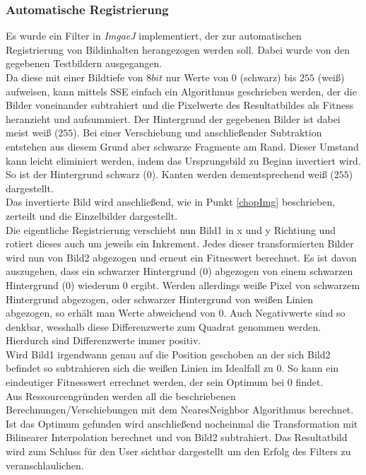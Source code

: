 \documentclass[12pt,german]{article}
\begin{document}
\subsubsection{Automatische Registrierung}
Es wurde ein Filter in \textit{ImgaeJ} implementiert, der zur automatischen Registrierung von Bildinhalten herangezogen werden soll. Dabei wurde von den gegebenen Testbildern ausgegangen. \\
Da diese mit einer Bildtiefe von $8 bit$ nur Werte von $0$ (schwarz) bis $255$ (weiß) aufweisen, kann mittels SSE einfach ein Algorithmus geschrieben werden, der die Bilder voneinander subtrahiert und die Pixelwerte des Resultatbildes als Fitness heranzieht und aufsummiert. Der Hintergrund der gegebenen Bilder ist dabei meist weiß ($255$). Bei einer Verschiebung und anschließender Subtraktion entstehen aus diesem Grund aber schwarze Fragmente am Rand. Dieser Umstand kann leicht eliminiert werden, indem das Ursprungsbild zu Beginn invertiert wird. So ist der Hintergrund schwarz ($0$). Kanten werden dementsprechend weiß ($255$) dargestellt. \\
Das invertierte Bild wird anschließend, wie in Punkt \ref{chopImg} beschrieben, zerteilt und die Einzelbilder dargestellt. \\
Die eigentliche Registrierung verschiebt nun Bild1 in x und y Richtiung und rotiert dieses auch um jeweils ein Inkrement. Jedes dieser transformierten Bilder wird nun von Bild2 abgezogen und erneut ein Fitneswert berechnet. Es ist davon auszugehen, dass ein schwarzer Hintergrund ($0$) abgezogen von einem schwarzen Hintergrund ($0$) wiederum $0$ ergibt. Werden allerdings weiße Pixel von schwarzem Hintergrund abgezogen, oder schwarzer Hintergrund von weißen Linien abgezogen, so erhält man Werte abweichend von $0$. Auch Negativwerte sind so denkbar, wesshalb diese Differenzwerte zum Quadrat genommen werden. Hierdurch sind Differenzwerte immer positiv.\\
Wird Bild1 irgendwann genau auf die Position geschoben an der sich Bild2 befindet so subtrahieren sich die weißen Linien im Idealfall zu $0$. So kann ein eindeutiger Fitnesswert errechnet werden, der sein Optimum bei $0$ findet.\\
Aus Ressourcengründen werden all die beschriebenen Berechnungen/Verschiebungen mit dem NearesNeighbor Algorithmus berechnet. Ist das Optimum gefunden wird anschließend nocheinmal die Transformation mit Bilinearer Interpolation berechnet und von Bild2 subtrahiert. Das Resultatbild wird zum Schluss für den User sichtbar dargestellt um den Erfolg des Filters zu veranschlaulichen. \\
\end{document}
